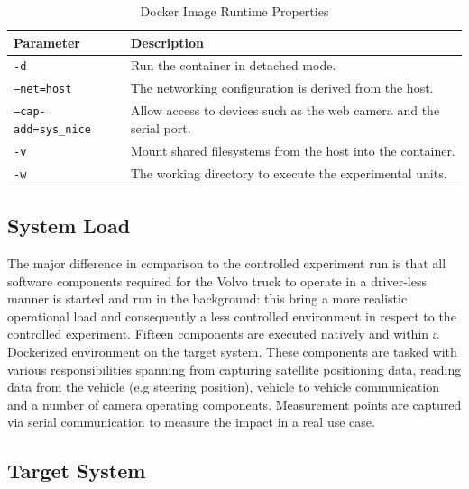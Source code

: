 \begin{table}[ht]
\centering
\caption{Docker Image Runtime Properties}
\label{docker-parameters-truck}
\begin{tabular}{|l|p{10cm}|}
\hline
\textbf{Parameter}           & \textbf{Description}                                            \\ \hline
\texttt{-d}                  & Run the container in detached mode.                             \\ \hline
\texttt{--net=host}          & The networking configuration is derived from the host.          \\ \hline
\texttt{--cap-add=sys\_nice} & Allow access to devices such as the web camera and the serial port. \\ \hline
\texttt{-v}                  & Mount shared filesystems from the host into the container.    \\ \hline
\texttt{-w}                  & The working directory to execute the experimental units.               \\ \hline
\end{tabular}
\end{table}


\subsection{System Load}
\label{sec:truck-load}

The major difference in comparison to the controlled experiment run is that all software components required for the Volvo truck to operate in a driver-less manner is started and run in the background: this bring a more realistic operational load and consequently a less controlled environment in respect to the controlled experiment. Fifteen components are executed natively and within a Dockerized environment on the target system. These components are tasked with various responsibilities spanning from capturing satellite positioning data, reading data from the vehicle (e.g steering position), vehicle to vehicle communication and a number of camera operating components. Measurement points are captured via serial communication to measure the impact in a real use case.\\

\subsection{Target System}
\label{sec:truck-target}

